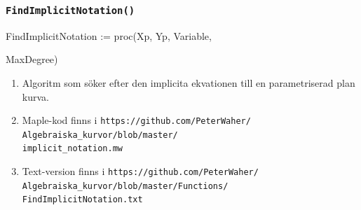 \documentclass{beamer}
\begin{document}
\begin{frame}
	\frametitle{\texttt{FindImplicitNotation()}}
	
	\begin{semiverbatim}
		FindImplicitNotation := proc(Xp, Yp, Variable,

\qquad MaxDegree)
	\end{semiverbatim}
	
	\begin{enumerate}
		\item<1-> Algoritm som söker efter den implicita ekvationen till en parametriserad plan kurva.
		
		\item<2-> Maple-kod finns i
		\texttt{https://github.com/PeterWaher/\\
			\qquad Algebraiska\_kurvor/blob/master/\\
			\qquad implicit\_notation.mw}

		\item<3-> Text-version finns i
		\texttt{https://github.com/PeterWaher/\\
			\qquad Algebraiska\_kurvor/blob/master/Functions/\\
			\qquad FindImplicitNotation.txt} 
	\end{enumerate}
\end{frame}
\end{document}
